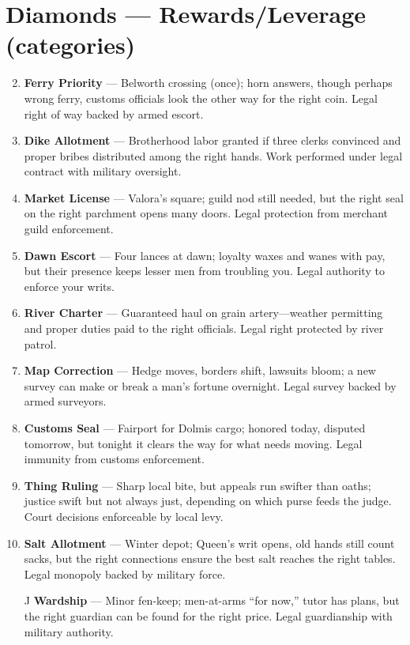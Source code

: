 \section*{Diamonds --- Rewards/Leverage (categories)}
\label{sec:viterra-rewards}
\begin{enumerate}
\setcounter{enumi}{1}
\item \textbf{Ferry Priority} --- Belworth crossing (once); horn answers, though perhaps wrong ferry, customs officials look the other way for the right coin. Legal right of way backed by armed escort.
\item \textbf{Dike Allotment} --- Brotherhood labor granted if three clerks convinced and proper bribes distributed among the right hands. Work performed under legal contract with military oversight.
\item \textbf{Market License} --- Valora's square; guild nod still needed, but the right seal on the right parchment opens many doors. Legal protection from merchant guild enforcement.
\item \textbf{Dawn Escort} --- Four lances at dawn; loyalty waxes and wanes with pay, but their presence keeps lesser men from troubling you. Legal authority to enforce your writs.
\item \textbf{River Charter} --- Guaranteed haul on grain artery—weather permitting and proper duties paid to the right officials. Legal right protected by river patrol.
\item \textbf{Map Correction} --- Hedge moves, borders shift, lawsuits bloom; a new survey can make or break a man's fortune overnight. Legal survey backed by armed surveyors.
\item \textbf{Customs Seal} --- Fairport for Dolmis cargo; honored today, disputed tomorrow, but tonight it clears the way for what needs moving. Legal immunity from customs enforcement.
\item \textbf{Thing Ruling} --- Sharp local bite, but appeals run swifter than oaths; justice swift but not always just, depending on which purse feeds the judge. Court decisions enforceable by local levy.
\item \textbf{Salt Allotment} --- Winter depot; Queen's writ opens, old hands still count sacks, but the right connections ensure the best salt reaches the right tables. Legal monopoly backed by military force.
\item[J] \textbf{Wardship} --- Minor fen-keep; men-at-arms ``for now,'' tutor has plans, but the right guardian can be found for the right price. Legal guardianship with military authority.

\end{enumerate}
